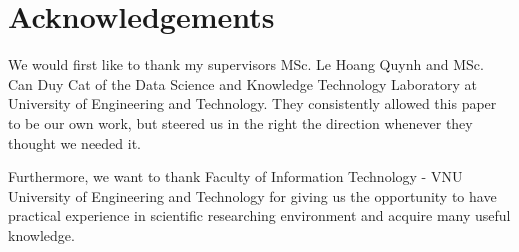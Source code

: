 \chapter*{Acknowledgements}

We would first like to thank my supervisors MSc. Le Hoang Quynh and MSc. Can Duy Cat of the Data Science and Knowledge Technology Laboratory at University of Engineering and Technology.
They consistently allowed this paper to be our own work, but steered us in the right the direction whenever they thought we needed it.





Furthermore, we want to thank Faculty of Information Technology - VNU University of Engineering and Technology for giving us the opportunity to have practical experience in scientific researching environment and acquire many useful knowledge.